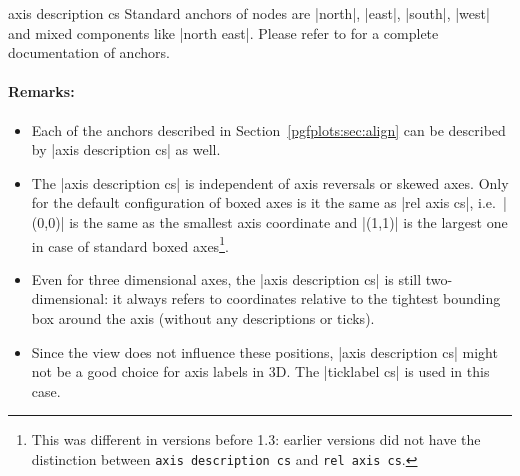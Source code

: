 \begin{coordinatesystem}{axis description cs}
	Standard anchors of nodes are |north|, |east|, |south|, |west| and mixed components like |north east|.
	Please refer to \cite{tikz} for a complete documentation of anchors.

\paragraph{Remarks:} 
\begin{itemize}
	\item Each of the anchors described in Section~\ref{pgfplots:sec:align} can be described by |axis description cs| as well.
	\item The |axis description cs| is independent of axis reversals or skewed axes.
	Only for the default configuration of boxed axes is it the same as |rel axis cs|, i.e.\ |(0,0)| is the same as the smallest axis coordinate and |(1,1)| is the largest one in case of standard boxed axes\footnote{This was different in versions before 1.3: earlier versions did not have the distinction between \texttt{axis description cs} and \texttt{rel axis cs}.}.

	\item Even for three dimensional axes, the |axis description cs| is still two-dimensional: it always refers to coordinates relative to the tightest bounding box around the axis (without any descriptions or ticks).
\begin{codeexample}[width=4cm]
\end{codeexample}
	
	\item Since the view does not influence these positions, |axis description cs| might not be a good choice for axis labels in 3D. The |ticklabel cs| is used in this case.
\end{itemize}
\end{coordinatesystem}

